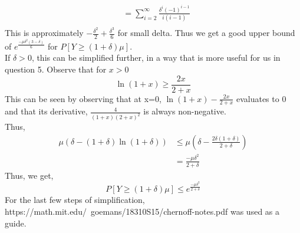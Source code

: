 \begin{enumerate}
\begin{align*}
        &= \sum_{i=2}^{\infty} \frac{\delta^i(-1)^{i-1}}{i(i-1)}\\
    \end{align*}
    This is approximately $-\frac{\delta^2}{2} + \frac{\delta^3}{6}$ for small delta. Thus we get a good upper bound of $e^{\frac{-\mu\delta^2(3-\delta)}{6}}$ for $P[Y\ge (1+\delta)\mu]$.\\
    If $\delta > 0$, this can be simplified further, in a way that is more useful for us in question 5. Observe that for $x > 0$
    \[
        \ln(1+x) \ge \frac{2x}{2+x}
    \]
    This can be seen by observing that at x=0, $\ln(1+x)-\frac{2x}{2+x}$ evaluates to 0 and that its derivative, $\frac{4}{(1+x)(2+x)^2}$ is always non-negative.\\
    Thus, 
    \begin{align*}
        \mu (\delta - (1+\delta)\ln(1+\delta)) &\le \mu (\delta - \frac{2\delta(1+\delta)}{2+\delta})\\
        &= \frac{-\mu\delta^2}{2+\delta}
    \end{align*}
    Thus, we get,
    \begin{equation}
        \label{eq:2}
        P[Y\ge (1+\delta)\mu] \le e^{\frac{-\mu\delta^2}{2+\delta}}
    \end{equation}
    For the last few steps of simplification, https://math.mit.edu/~goemans/18310S15/chernoff-notes.pdf was used as a guide.
\end{enumerate}
